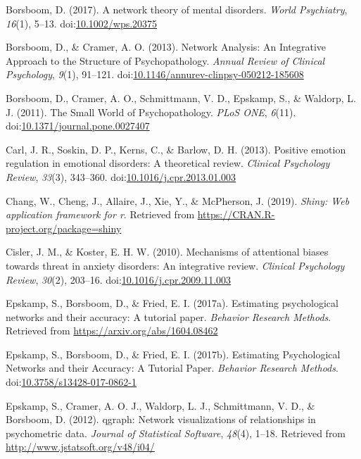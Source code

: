 \documentclass[man,floatsintext]{apa6}
\begin{document}
\leavevmode\hypertarget{ref-Borsboom2017}{}%
Borsboom, D. (2017). A network theory of mental disorders. \emph{World Psychiatry}, \emph{16}(1), 5--13. doi:\href{https://doi.org/10.1002/wps.20375}{10.1002/wps.20375}

\leavevmode\hypertarget{ref-borsboom_network_2013}{}%
Borsboom, D., \& Cramer, A. O. (2013). Network Analysis: An Integrative Approach to the Structure of Psychopathology. \emph{Annual Review of Clinical Psychology}, \emph{9}(1), 91--121. doi:\href{https://doi.org/10.1146/annurev-clinpsy-050212-185608}{10.1146/annurev-clinpsy-050212-185608}

\leavevmode\hypertarget{ref-borsboom_small_2011}{}%
Borsboom, D., Cramer, A. O., Schmittmann, V. D., Epskamp, S., \& Waldorp, L. J. (2011). The Small World of Psychopathology. \emph{PLoS ONE}, \emph{6}(11). doi:\href{https://doi.org/10.1371/journal.pone.0027407}{10.1371/journal.pone.0027407}

\leavevmode\hypertarget{ref-Carl2013}{}%
Carl, J. R., Soskin, D. P., Kerns, C., \& Barlow, D. H. (2013). Positive emotion regulation in emotional disorders: A theoretical review. \emph{Clinical Psychology Review}, \emph{33}(3), 343--360. doi:\href{https://doi.org/10.1016/j.cpr.2013.01.003}{10.1016/j.cpr.2013.01.003}

\leavevmode\hypertarget{ref-R-shiny}{}%
Chang, W., Cheng, J., Allaire, J., Xie, Y., \& McPherson, J. (2019). \emph{Shiny: Web application framework for r}. Retrieved from \url{https://CRAN.R-project.org/package=shiny}

\leavevmode\hypertarget{ref-Cisler2010a}{}%
Cisler, J. M., \& Koster, E. H. W. (2010). Mechanisms of attentional biases towards threat in anxiety disorders: An integrative review. \emph{Clinical Psychology Review}, \emph{30}(2), 203--16. doi:\href{https://doi.org/10.1016/j.cpr.2009.11.003}{10.1016/j.cpr.2009.11.003}

\leavevmode\hypertarget{ref-R-bootnet}{}%
Epskamp, S., Borsboom, D., \& Fried, E. I. (2017a). Estimating psychological networks and their accuracy: A tutorial paper. \emph{Behavior Research Methods}. Retrieved from \url{https://arxiv.org/abs/1604.08462}

\leavevmode\hypertarget{ref-epskamp_estimating_2017}{}%
Epskamp, S., Borsboom, D., \& Fried, E. I. (2017b). Estimating Psychological Networks and their Accuracy: A Tutorial Paper. \emph{Behavior Research Methods}. doi:\href{https://doi.org/10.3758/s13428-017-0862-1}{10.3758/s13428-017-0862-1}

\leavevmode\hypertarget{ref-R-qgraph}{}%
Epskamp, S., Cramer, A. O. J., Waldorp, L. J., Schmittmann, V. D., \& Borsboom, D. (2012). qgraph: Network visualizations of relationships in psychometric data. \emph{Journal of Statistical Software}, \emph{48}(4), 1--18. Retrieved from \url{http://www.jstatsoft.org/v48/i04/}
\end{document}
